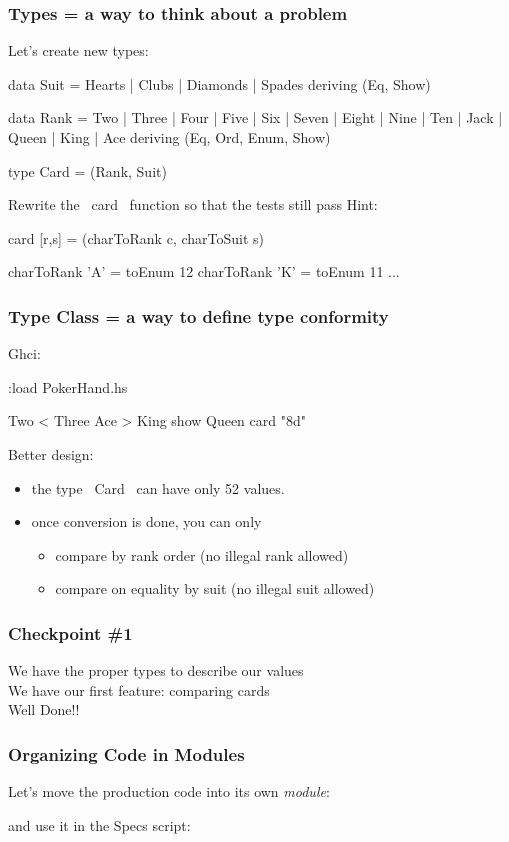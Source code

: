 \documentclass[11pt,xcolor={dvipsnames}]{beamer}
\newcommand{\tc}{\textcolor}
\newcommand{\key}[1]{\tc{orange}{#1}}
\newcommand{\rk}{\enskip{\key{$\hookleftarrow$}}}
\newcommand{\vs}{\vspace{1em}}
\newcommand{\lstH}[1]{}
\newcommand{\lstT}[1]{}
\begin{document}
\begin{frame}[fragile]
\frametitle{Types = a way to think about a problem}
Let's create new types:
\begin{haskell}
data Suit = Hearts | Clubs | Diamonds | Spades
    deriving (Eq, Show)

data Rank = Two | Three | Four | Five | Six | Seven | Eight 
          | Nine | Ten | Jack | Queen | King | Ace
    deriving (Eq, Ord, Enum, Show)

type Card = (Rank, Suit)
\end{haskell}
Rewrite the ~card~ function so that the tests still pass
\vs
Hint:
\begin{haskell}
card [r,s] = (charToRank c, charToSuit s)

charToRank 'A' = toEnum 12
charToRank 'K' = toEnum 11
...
\end{haskell}
\end{frame}
\begin{frame}[fragile]
\frametitle{Type Class = a way to define type conformity}
Ghci:
\begin{term}
:load PokerHand.hs\rk

Two < Three\rk
Ace > King\rk
show Queen\rk
card "8d"\rk
\end{term}
Better design:
\begin{itemize}
\item  the type ~Card~ can have only 52 values.
\item  once conversion is done, you can only
\begin{itemize}
\item compare by rank order (no illegal rank allowed)
\item compare on equality by suit (no illegal suit allowed)
\end{itemize}
\end{itemize}
\end{frame}
\begin{frame}[fragile]
\frametitle{Checkpoint \#1}
\begin{center}
We have the proper types to describe our values\\
\vs
We have our first feature: comparing cards\\
\vs
\Large{Well Done!!}
\end{center}
\end{frame}
\begin{frame}[fragile]
\frametitle{Organizing Code in Modules}
Let's move the production code into its own \emph{module}:
\lstH{029a}
and use it in the Specs script:
\lstT{029b}
\end{frame}
\end{document}
